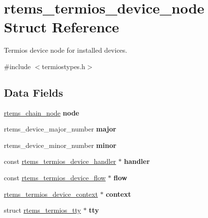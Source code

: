 \hypertarget{structrtems__termios__device__node}{}\section{rtems\+\_\+termios\+\_\+device\+\_\+node Struct Reference}
\label{structrtems__termios__device__node}


Termios device node for installed devices.  




{\ttfamily \#include $<$termiostypes.\+h$>$}

\subsection*{Data Fields}
\begin{DoxyCompactItemize}
\item 
\mbox{\label{structrtems__termios__device__node_afc114663c4ee4fb88bfe47a99b8bd478}} 
\mbox{\hyperlink{structChain__Node__struct}{rtems\+\_\+chain\+\_\+node}} {\bfseries node}
\item 
\mbox{\label{structrtems__termios__device__node_a0be89109e5bdd983595c290e8ef24b49}} 
rtems\+\_\+device\+\_\+major\+\_\+number {\bfseries major}
\item 
\mbox{\label{structrtems__termios__device__node_a44780acfdfc3df4705efa407ecd8dd61}} 
rtems\+\_\+device\+\_\+minor\+\_\+number {\bfseries minor}
\item 
\mbox{\label{structrtems__termios__device__node_a56f022945ee6e9313859723f9154e57a}} 
const \mbox{\hyperlink{structrtems__termios__device__handler}{rtems\+\_\+termios\+\_\+device\+\_\+handler}} $\ast$ {\bfseries handler}
\item 
\mbox{\label{structrtems__termios__device__node_aced8b5ae606b1e4a1263fd0a88078576}} 
const \mbox{\hyperlink{structrtems__termios__device__flow}{rtems\+\_\+termios\+\_\+device\+\_\+flow}} $\ast$ {\bfseries flow}
\item 
\mbox{\label{structrtems__termios__device__node_ace07b2b3ea95a6addf46c9209d89322a}} 
\mbox{\hyperlink{structrtems__termios__device__context}{rtems\+\_\+termios\+\_\+device\+\_\+context}} $\ast$ {\bfseries context}
\item 
\mbox{\label{structrtems__termios__device__node_add562601aaf5a87d3a5de91ea0886cb2}} 
struct \mbox{\hyperlink{structrtems__termios__tty}{rtems\+\_\+termios\+\_\+tty}} $\ast$ {\bfseries tty}
\end{DoxyCompactItemize}


